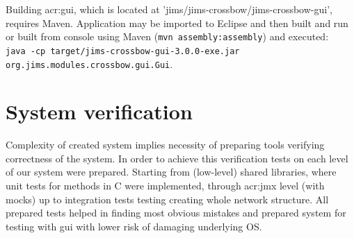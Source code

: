 \documentclass[11pt,openany]{book}
\begin{document}
        Building \gls{acr:gui}, which is located at 'jims/jims-crossbow/jims-crossbow-gui', requires Maven.
        Application may be imported to Eclipse and then built and run or built from console using Maven (\texttt{mvn
        assembly:assembly}) and executed: \\
        \texttt{java -cp target/jims-crossbow-gui-3.0.0-exe.jar org.jims.modules.crossbow.gui.Gui}.






		

    \section{System verification}
    \label{sec:impl:verif}
  
      Complexity of created system implies necessity of preparing tools verifying correctness of the system. In order to
      achieve this verification tests on each level of our system were prepared. Starting from (low-level) shared
      libraries, where unit tests for methods in C were implemented, through \gls{acr:jmx} level (with mocks) up to
      integration tests testing creating whole network structure. All prepared tests helped in finding most obvious
      mistakes and prepared system for testing with gui with lower risk of damaging underlying OS.  
\end{document}
